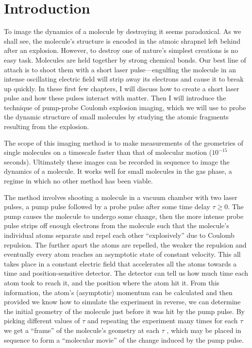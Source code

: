 \chapter{Introduction}\label{ch:introduction}

To image the dynamics of a molecule by destroying it seems paradoxical. As we shall see, the molecule's structure is encoded in the atmoic shrapnel left behind after an explosion. However, to destroy one of nature's simplest creations is no easy task. Molecules are held together by strong chemical bonds. Our best line of attach is to shoot them with a short laser pulse---engulfing the molecule in an intense oscillating electric field will strip away its electrons and cause it to break up quickly. In these first few chapters, I will discuss how to create a short laser pulse and how these pulses interact with matter. Then I will introduce the technique of pump-probe Coulomb explosion imaging, which we will use to probe the dynamic structure of small molecules by studying the atomic fragments resulting from the explosion.

The scope of this imaging method is to make measurements of the geometries of single molecules on a timescale faster than that of molecular motion ($10^{-15}$ seconds). Ultimately these images can be recorded in sequence to image the dynamics of a molecule. It works well for small molecules in the gas phase, a regime in which no other method has been viable.

The method involves shooting a molecule in a vacuum chamber with two laser pulses, a pump pulse followed by a probe pulse after some time delay $\tau \ge 0$. The pump causes the molecule to undergo some change, then the more intense probe pulse strips off enough electrons from the molecule such that the molecule's individual atoms separate and repel each other ``explosively'' due to Coulomb repulsion. The further apart the atoms are repelled, the weaker the repulsion and eventually every atom reaches an asymptotic state of constant velocity. This all takes place in a constant electric field that accelerates all the atoms towards a time and position-sensitive detector. The detector can tell us how much time each atom took to reach it, and the position where the atom hit it. From this information, the atom’s (asymptotic) momentum can be calculated and then provided we know how to simulate the experiment in reverse, we can determine the initial geometry of the molecule just before it was hit by the pump pulse. By picking different values of $\tau$ and repeating the experiment many times for each $\tau$ we get a ``frame'' of the molecule's geometry at each $\tau$ , which may be placed in sequence to form a ``molecular movie'' of the change induced by the pump pulse.

